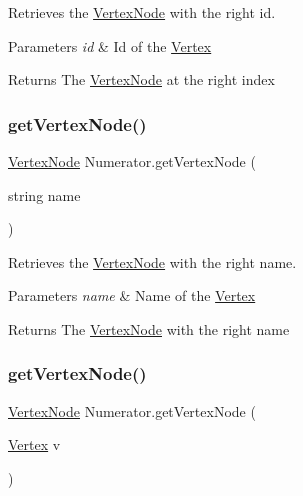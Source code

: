 Retrieves the \hyperlink{classVertexNode}{Vertex\+Node} with the right id. 


\begin{DoxyParams}{Parameters}
{\em id} & Id of the \hyperlink{structVertex}{Vertex}\\
\hline
\end{DoxyParams}
\begin{DoxyReturn}{Returns}
The \hyperlink{classVertexNode}{Vertex\+Node} at the right index
\end{DoxyReturn}
\mbox{\label{classNumerator_a1b4e078d6a0b4ae14b48f747cd9394a2}} 
\subsubsection{\texorpdfstring{get\+Vertex\+Node()}{getVertexNode()}\hspace{0.1cm}{\footnotesize\ttfamily [2/3]}}
{\footnotesize\ttfamily \hyperlink{classVertexNode}{Vertex\+Node} Numerator.\+get\+Vertex\+Node (\begin{DoxyParamCaption}\item[{string}]{name }\end{DoxyParamCaption})\hspace{0.3cm}{\ttfamily [inline]}}



Retrieves the \hyperlink{classVertexNode}{Vertex\+Node} with the right name. 


\begin{DoxyParams}{Parameters}
{\em name} & Name of the \hyperlink{structVertex}{Vertex}\\
\hline
\end{DoxyParams}
\begin{DoxyReturn}{Returns}
The \hyperlink{classVertexNode}{Vertex\+Node} with the right name
\end{DoxyReturn}
\mbox{\label{classNumerator_af1261c09ecf6d1bee5f2da73fb89507d}} 
\subsubsection{\texorpdfstring{get\+Vertex\+Node()}{getVertexNode()}\hspace{0.1cm}{\footnotesize\ttfamily [3/3]}}
{\footnotesize\ttfamily \hyperlink{classVertexNode}{Vertex\+Node} Numerator.\+get\+Vertex\+Node (\begin{DoxyParamCaption}\item[{\hyperlink{structVertex}{Vertex}}]{v }\end{DoxyParamCaption})\hspace{0.3cm}{\ttfamily [inline]}}



